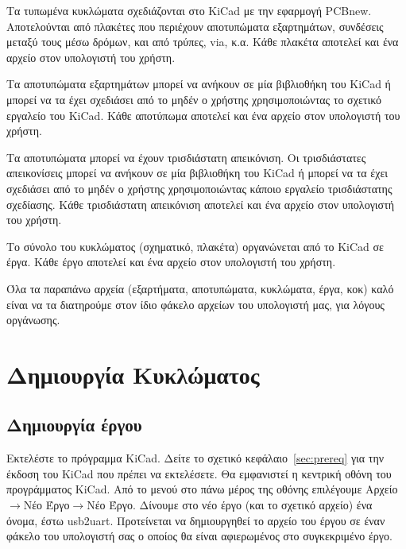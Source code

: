\documentclass[a4paper]{article}
\begin{document}
Τα τυπωμένα κυκλώματα σχεδιάζονται στο KiCad με την εφαρμογή PCBnew. Αποτελούνται από πλακέτες που περιέχουν αποτυπώματα εξαρτημάτων, συνδέσεις μεταξύ τους μέσω δρόμων, και από τρύπες, via, κ.α.
Κάθε πλακέτα αποτελεί και ένα αρχείο στον υπολογιστή του χρήστη. 

Τα αποτυπώματα εξαρτημάτων μπορεί να ανήκουν σε μία βιβλιοθήκη του KiCad ή μπορεί να τα έχει σχεδιάσει από το μηδέν ο χρήστης χρησιμοποιώντας το σχετικό εργαλείο του KiCad. Κάθε αποτύπωμα αποτελεί και ένα αρχείο στον υπολογιστή του χρήστη. 

Τα αποτυπώματα μπορεί να έχουν τρισδιάστατη απεικόνιση. Οι τρισδιάστατες απεικονίσεις μπορεί να ανήκουν σε μία βιβλιοθήκη του KiCad ή μπορεί να τα έχει σχεδιάσει από το μηδέν ο χρήστης χρησιμοποιώντας κάποιο εργαλείο τρισδιάστατης σχεδίασης. Κάθε τρισδιάστατη απεικόνιση αποτελεί και ένα αρχείο στον υπολογιστή του χρήστη. 

Το σύνολο του κυκλώματος (σχηματικό, πλακέτα) οργανώνεται από το KiCad σε έργα. Κάθε έργο αποτελεί και ένα αρχείο στον υπολογιστή του χρήστη. 

Όλα τα παραπάνω αρχεία (εξαρτήματα, αποτυπώματα, κυκλώματα, έργα, κοκ) καλό είναι να τα διατηρούμε στον ίδιο φάκελο αρχείων του υπολογιστή μας, για λόγους οργάνωσης.

\section{Δημιουργία Κυκλώματος}

\subsection{Δημιουργία έργου}
Εκτελέστε το πρόγραμμα KiCad. Δείτε το σχετικό κεφάλαιο~\ref{sec:prereq} για την έκδοση του KiCad που πρέπει να εκτελέσετε. Θα εμφανιστεί η κεντρική οθόνη του προγράμματος KiCad. Από το μενού στο πάνω μέρος της οθόνης επιλέγουμε Αρχείο$\rightarrow$Νέο Έργο$\rightarrow$Νέο Έργο. Δίνουμε στο νέο έργο (και το σχετικό αρχείο) ένα όνομα, έστω usb2uart. Προτείνεται να δημιουργηθεί το αρχείο του έργου σε έναν φάκελο του υπολογιστή σας ο οποίος θα είναι αφιερωμένος στο συγκεκριμένο έργο.

\begin{figure}
  \begin{center}
    \label{fig:kicad-main}
  \end{center}
\end{figure}
\end{document}
